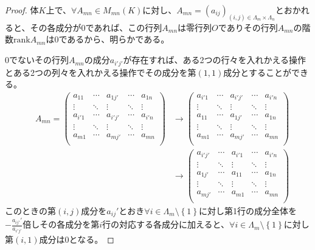 \documentclass[dvipdfmx]{jsarticle}
\begin{document}
\begin{proof}
体$K$上で、$\forall A_{mn} \in M_{mn}(K)$に対し、$A_{mn} = \left( a_{ij} \right)_{(i,j) \in \varLambda_{m} \times \varLambda_{n}}$とおかれると、その各成分が0であれば、この行列$A_{mn}$は零行列$O$でありその行列$A_{mn}$の階数${\mathrm{rank}}A_{mn}$は0であるから、明らかである。\par
0でないその行列$A_{mn}$の成分$a_{i'j'}$が存在すれば、ある2つの行々を入れかえる操作とある2つの列々を入れかえる操作でその成分を第$(1,1)$成分とすることができる。
\begin{align*}
\quad A_{mn} = \begin{pmatrix}
a_{11} & \cdots & a_{1j'} & \cdots & a_{1n} \\
 \vdots & \ddots & \vdots & \ddots & \vdots \\
a_{i'1} & \cdots & a_{i'j'} & \cdots & a_{i'n} \\
 \vdots & \ddots & \vdots & \ddots & \vdots \\
a_{m1} & \cdots & a_{mj'} & \cdots & a_{mn} \\
\end{pmatrix} &\rightarrow \begin{pmatrix}
a_{i'1} & \cdots & a_{i'j'} & \cdots & a_{i'n} \\
 \vdots & \ddots & \vdots & \ddots & \vdots \\
a_{11} & \cdots & a_{1j'} & \cdots & a_{1n} \\
 \vdots & \ddots & \vdots & \ddots & \vdots \\
a_{m1} & \cdots & a_{mj'} & \cdots & a_{mn} \\
\end{pmatrix}\\
&\rightarrow \begin{pmatrix}
a_{i'j'} & \cdots & a_{i'1} & \cdots & a_{i'n} \\
 \vdots & \ddots & \vdots & \ddots & \vdots \\
a_{1j'} & \cdots & a_{11} & \cdots & a_{1n} \\
 \vdots & \ddots & \vdots & \ddots & \vdots \\
a_{mj'} & \cdots & a_{m1} & \cdots & a_{mn} \\
\end{pmatrix}
\end{align*}
このときの第$(i,j)$成分を$a_{ij}'$とおき$\forall i \in \varLambda_{m} \setminus \left\{ 1 \right\}$に対し第1行の成分全体を$- \frac{a_{ij'}'}{a_{i'j'}}$倍しその各成分を第$i$行の対応する各成分に加えると、$\forall i \in \varLambda_{m} \setminus \left\{ 1 \right\}$に対し第$(i,1)$成分は0となる。

\end{proof}
\end{document}
